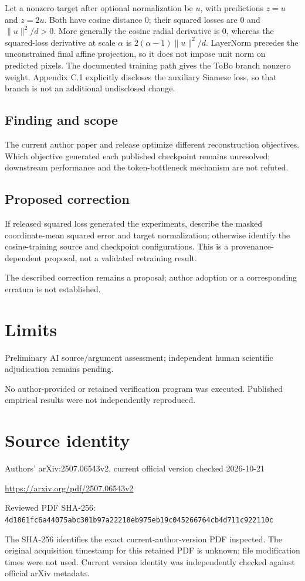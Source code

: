 \documentclass[11pt]{article}
\begin{document}
Let a nonzero target after optional normalization be \(u\), with predictions \(z=u\) and \(z=2u\). Both have cosine distance \(0\); their squared losses are \(0\) and \(\|u\|^2/d>0\). More generally the cosine radial derivative is \(0\), whereas the squared-loss derivative at scale \(\alpha\) is \(2(\alpha-1)\|u\|^2/d\). LayerNorm precedes the unconstrained final affine projection, so it does not impose unit norm on predicted pixels. The documented training path gives the ToBo branch nonzero weight. Appendix C.1 explicitly discloses the auxiliary Siamese loss, so that branch is not an additional undisclosed change.

\subsection*{Finding and scope}

The current author paper and release optimize different reconstruction objectives. Which objective generated each published checkpoint remains unresolved; downstream performance and the token-bottleneck mechanism are not refuted.

\subsection*{Proposed correction}

If released squared loss generated the experiments, describe the masked coordinate-mean squared error and target normalization; otherwise identify the cosine-training source and checkpoint configurations. This is a provenance-dependent proposal, not a validated retraining result.

The described correction remains a proposal; author adoption or a corresponding erratum is not established.

\section*{Limits}

Preliminary AI source/argument assessment; independent human scientific adjudication remains pending.\par

No author-provided or retained verification program was executed. Published empirical results were not independently reproduced.\par

\section*{Source identity}

Authors’ arXiv:2507.06543v2, current official version checked 2026-10-21

\url{https://arxiv.org/pdf/2507.06543v2}

Reviewed PDF SHA-256: \nolinkurl{4d1861fc6a44075abc301b97a22218eb975eb19c045266764cb4d711c922110c}

The SHA-256 identifies the exact current-author-version PDF inspected. The original acquisition timestamp for this retained PDF is unknown; file modification times were not used. Current version identity was independently checked against official arXiv metadata.
\end{document}
